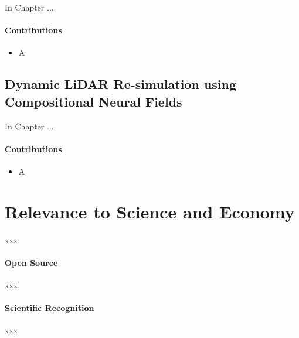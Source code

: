 In Chapter ...

\paragraph{Contributions}
\begin{itemize}
\item A
\end{itemize}


\subsection{Dynamic LiDAR Re-simulation using Compositional Neural Fields}

In Chapter ...

\paragraph{Contributions}
\begin{itemize}
\item A
\end{itemize}





\section{Relevance to Science and Economy}

xxx

\paragraph{Open Source}
xxx

\paragraph{Scientific Recognition}
xxx